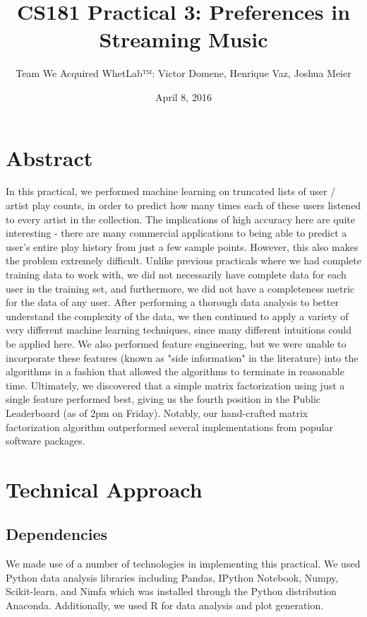 \documentclass[10pt]{article}
\title{CS181 Practical 3: Preferences in Streaming Music}
\author{Team We Acquired WhetLab™: Victor Domene, Henrique Vaz, Joshua Meier }
\date{April 8, 2016}
\begin{document}
\maketitle

\section{Abstract}
In this practical, we performed machine learning on truncated lists of user / artist play counts, in order to predict how many times each of these users listened to every artist in the collection. The implications of high accuracy here are quite interesting - there are many commercial applications to being able to predict a user's entire play history from just a few sample points. However, this also makes the problem extremely difficult. Unlike previous practicals where we had complete training data to work with, we did not necessarily have complete data for each user in the training set, and furthermore, we did not have a completeness metric for the data of any user. After performing a thorough data analysis to better understand the complexity of the data, we then continued to apply a variety of very different machine learning techniques, since many different intuitions could be applied here. We also performed feature engineering, but we were unable to incorporate these features (known as "side information" in the literature) into the algorithms in a fashion that allowed the algorithms to terminate in reasonable time. Ultimately, we discovered that a simple matrix factorization using just a single feature performed best, giving us the fourth position in the Public Leaderboard (as of 2pm on Friday). Notably, our hand-crafted matrix factorization algorithm outperformed several implementations from popular software packages. 

\section{Technical Approach}
\subsection{Dependencies}

We made use of a number of technologies in implementing this practical. We used Python data analysis libraries including Pandas, IPython Notebook, Numpy, Scikit-learn, and Nimfa which was installed through the Python distribution Anaconda. Additionally, we used R for data analysis and plot generation.
\end{document}
